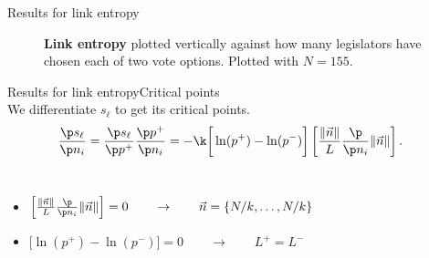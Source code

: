 \setlength\fboxsep{0pt}
\setlength\fboxrule{0pt}
\begin{frame}{Results for link entropy}
\vspace{-2mm}
\begin{figure}[h]
    \centering
    \caption{\textbf{Link entropy} plotted vertically against how many legislators have chosen each of two vote options. Plotted with $N=155.$}
    \label{fig:SL}
\end{figure}
\end{frame}

\begin{frame}[t]{Results for link entropy}{Critical points}
	\setlength\fboxrule{0.5pt}
	\setlength\fboxsep{4pt}
\\[1em]

We differentiate $s_\ell$ to get its critical points.
\begin{align}
	\frac{\p s_\ell }{\p n_i} &= \frac{\p s_\ell}{\p p^{+}} \frac{\p p^{+}}{\p n_i} = -\k \bigg[ \ln(p^{+}) - \ln(p^{-}) \bigg] \left[ \frac{\|\vec{n}\|}{L}  \frac{\p}{\p n_i} \|\vec{n}\|  \right] 
.\end{align}
\\[2em]

\begin{itemize}
	\item $\left[ \frac{\|\vec{n}\|}{L}  \frac{\p}{\p n_i} \|\vec{n}\|  \right] =0\qquad  \to \qquad \vec{n} = \{N / k, \ldots, N / k \}$ 
	\item $\Big[ \ln(p^{+}) - \ln(p^{-}) \Big] = 0 \qquad \to \qquad L^{+} = L^{-}$
\end{itemize}
	
\end{frame}


